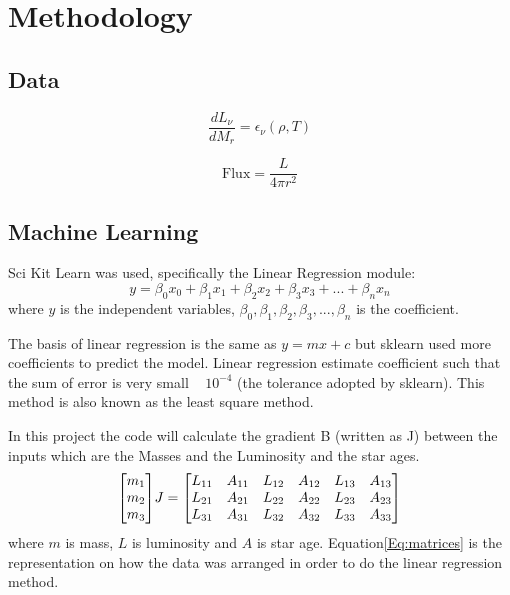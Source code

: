 \section{Methodology}

\subsection{Data}

\begin{equation}
    \frac{dL_\nu}{dM_{r}}=\epsilon_{\nu}(\rho,T)
\end{equation}

\begin{equation}
    \mathrm{Flux}=\frac{L}{4\pi r^2}
\end{equation}


\subsection{Machine Learning}
Sci Kit Learn was used, specifically the Linear Regression module:
\begin{equation}
    y=\beta_{0}x_0+\beta_{1}x_1+\beta_{2}x_2+\beta_{3}x_3+...+\beta_{n}x_n
\end{equation}
where 
$y$ is the independent variables, $\beta_0, \beta_{1}, \beta_{2}, \beta_{3},..., \beta_{n}$ is the coefficient. 

The basis of linear regression is the same as $y= mx+c$ but sklearn used more coefficients to predict the model. Linear regression estimate  coefficient such that the sum of error is very small ~  $10^{-4}$ (the tolerance adopted by sklearn). This method is also known as the least square method.

In this project the code will calculate the gradient B (written as J)  between the inputs which are the Masses and the Luminosity and the star ages.
\begin{equation}
    \mqty[
        m_{1}\\m_{2}\\m_{3}  
    ]
    J
    =
    \mqty[
        L_{11}&A_{11}&L_{12}&A_{12}&L_{13}&A_{13}\\
        L_{21}&A_{21}&L_{22}&A_{22}&L_{23}&A_{23}\\
        L_{31}&A_{31}&L_{32}&A_{32}&L_{33}&A_{33}
    ]
    \label{Eq:matrices}
\end{equation}
where $m$ is mass, $L$ is luminosity and $A$ is star age.
Equation\ref{Eq:matrices} is the representation on how the data was arranged in order to do the linear regression method. 

